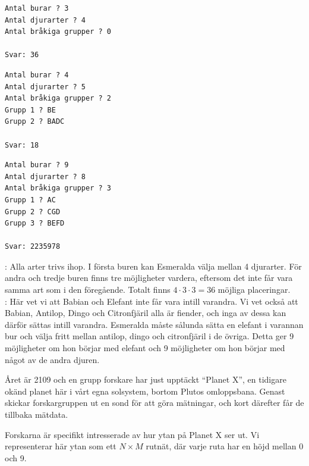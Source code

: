 \begin{multicols}{2}

\begin{verbatim}
Antal burar ? 3
Antal djurarter ? 4
Antal bråkiga grupper ? 0

Svar: 36
\end{verbatim}

\begin{verbatim}
Antal burar ? 4
Antal djurarter ? 5
Antal bråkiga grupper ? 2
Grupp 1 ? BE
Grupp 2 ? BADC

Svar: 18
\end{verbatim}

\begin{verbatim}
Antal burar ? 9
Antal djurarter ? 8
Antal bråkiga grupper ? 3
Grupp 1 ? AC
Grupp 2 ? CGD
Grupp 3 ? BEFD 

Svar: 2235978
\end{verbatim}

\vfill\columnbreak
{}: Alla arter trivs ihop. I första buren kan Esmeralda välja mellan 4 djurarter. För andra och tredje buren finns tre möjligheter vardera, eftersom det inte får vara samma art som i den föregående. Totalt finns $4\cdot 3\cdot 3=36$ möjliga placeringar.\\

: Här vet vi att Babian och Elefant inte får vara intill varandra. Vi vet också att Babian, Antilop, Dingo och Citronfjäril alla är fiender, och inga av dessa kan därför sättas intill varandra. Esmeralda måste sålunda sätta en elefant i varannan bur och välja fritt mellan antilop, dingo och citronfjäril i de övriga. Detta ger 9 möjligheter om hon börjar med elefant och 9 möjligheter om hon börjar med något av de andra djuren.

\end{multicols}

\newpage
{}

Året är 2109 och en grupp forskare har just upptäckt ``Planet X'', 
en tidigare okänd planet här i vårt egna solsystem,
bortom Plutos omloppsbana. Genast skickar forskargruppen ut
en sond för att göra mätningar, och kort därefter får de tillbaka mätdata.

Forskarna är specifikt intresserade av hur ytan på Planet X ser ut.
Vi representerar här ytan som ett $N \times M$ rutnät, där varje ruta
har en höjd mellan 0 och 9.

